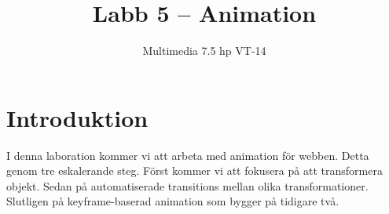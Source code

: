 \documentclass[12pt]{article}
\date{}
\title{ Labb 5 -- Animation }
\author{ Multimedia 7.5 hp VT-14 }
\begin{document}
\maketitle
\vspace{-3.5em}




\section{Introduktion}
I denna laboration kommer vi att arbeta med animation för webben. Detta genom tre eskalerande steg. Först kommer vi att fokusera på att transformera objekt. Sedan på automatiserade transitions mellan olika transformationer. Slutligen på keyframe-baserad animation som bygger på tidigare två.
\end{document}
